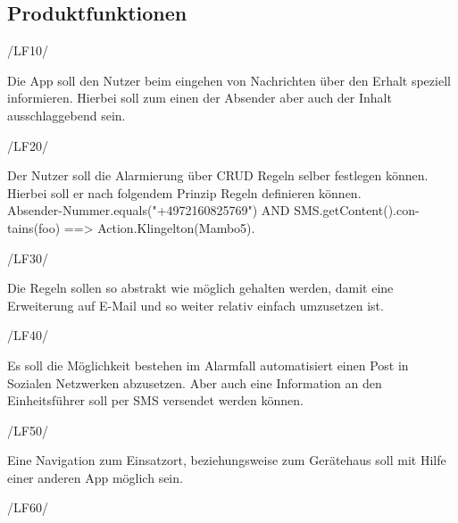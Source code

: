 \subsection{Produktfunktionen}
\begin{minipage}{3cm}
/LF10/
\end{minipage}
\begin{minipage}{13cm}
Die App soll den Nutzer beim eingehen von Nachrichten \"uber den Erhalt speziell informieren. Hierbei soll zum einen der Absender aber auch der Inhalt ausschlaggebend sein.\\
\end{minipage}
\begin{minipage}{3cm}
/LF20/
\end{minipage}
\begin{minipage}{13cm}
Der Nutzer soll die Alarmierung \"uber CRUD Regeln selber festlegen k\"onnen. Hierbei soll er nach folgendem Prinzip Regeln definieren k\"onnen.\\
Absender-Nummer.equals("+4972160825769") AND SMS.getContent().con-tains(foo)
==> Action.Klingelton(Mambo5).\\
\end{minipage}
\begin{minipage}{3cm}
/LF30/
\end{minipage}
\begin{minipage}{13cm}
Die Regeln sollen so abstrakt wie m\"oglich gehalten werden, damit eine Erweiterung auf E-Mail und so weiter relativ einfach umzusetzen ist.\\
\end{minipage}
\begin{minipage}{3cm}
/LF40/
\end{minipage}
\begin{minipage}{13cm}
Es soll die M\"oglichkeit bestehen im Alarmfall automatisiert einen Post in Sozialen Netzwerken abzusetzen. Aber auch eine Information an den Einheitsf\"uhrer soll per SMS versendet werden k\"onnen.\\
\end{minipage}
\begin{minipage}{3cm}
/LF50/
\end{minipage}
\begin{minipage}{13cm}
Eine Navigation zum Einsatzort, beziehungsweise zum Ger\"atehaus soll mit Hilfe einer anderen App m\"oglich sein.\\
\end{minipage}
\begin{minipage}{3cm}
/LF60/
\end{minipage}
